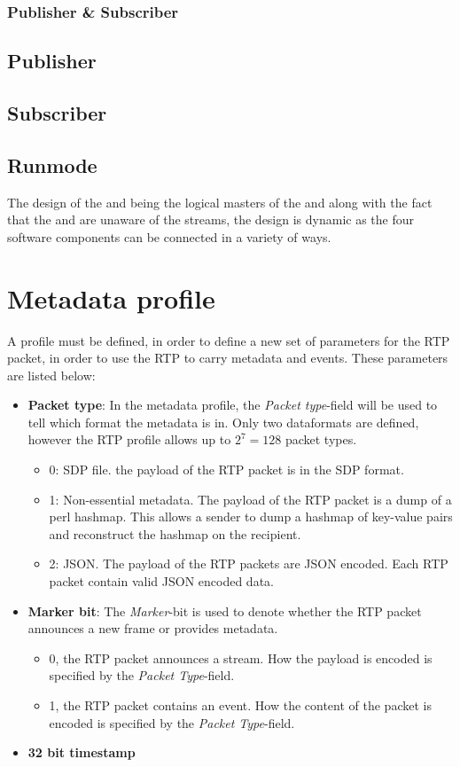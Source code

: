 \subsubsection{Publisher \& Subscriber}
\subsection{Publisher}
\subsection{Subscriber}
\subsection{Runmode}
The design of the \pubs{} and \subs{} being the logical masters of the \pros{} and \cons{} along with the fact that the \cons{} and \pros{} are unaware of the streams, the design is dynamic as the four software components can be connected in a variety of ways.

\section{Metadata profile} \label{sec:implemented:metadataprofile} 
A profile must be defined, in order to define a new set of parameters for the RTP packet, in order to use the RTP to carry metadata and events. These parameters are listed below:

\begin{itemize}
	\item \textbf{Packet type}: In the metadata profile, the \textit{Packet type}-field will be used to tell which format the metadata is in. Only two  dataformats are defined, however the RTP profile allows up to $2^7=128$  packet types.
		\begin{itemize}
			\item 0: SDP file. the payload of the RTP packet is in the SDP format.
			\item 1: Non-essential metadata. The payload of the RTP packet is a dump of a perl hashmap. This allows a sender to dump a hashmap of key-value pairs and reconstruct the hashmap on the recipient.
			\item 2: JSON. The payload of the RTP packets are JSON encoded. Each RTP packet contain valid JSON encoded data.
		\end{itemize}
	\item \textbf{Marker bit}: The \textit{Marker}-bit is used to denote whether the RTP packet announces a new frame or provides metadata.
		\begin{itemize}
			\item 0, the RTP packet announces a stream. How the payload is encoded is specified by the \textit{Packet Type}-field.
			\item 1, the RTP packet contains an event. How the content of the packet is encoded is specified by the \textit{Packet Type}-field.
		\end{itemize}
	\item \textbf{32 bit timestamp}
\end{itemize}


